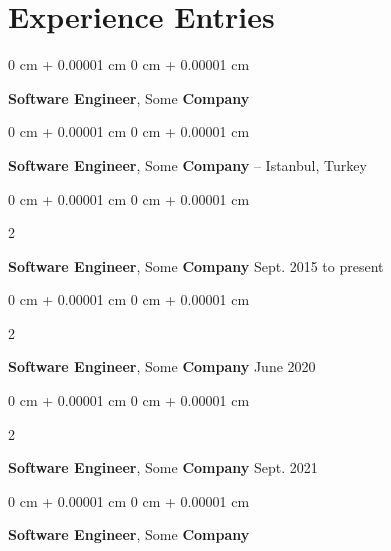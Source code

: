 \documentclass[10pt, letterpaper]{article}
\newenvironment{onecolentry}{
    \begin{adjustwidth}{
        0 cm + 0.00001 cm
    }{
        0 cm + 0.00001 cm
    }
}{
    \end{adjustwidth}
} %
\newenvironment{twocolentry}[2][]{
    \onecolentry
    \def\secondColumn{#2}
    \setcolumnwidth{\fill, 4.1 cm}
    \begin{paracol}{2}
}{
    \switchcolumn \raggedleft \secondColumn
    \end{paracol}
    \endonecolentry
} %
\begin{document}
    
    \section{Experience Entries}

        
        \begin{onecolentry}
            \textbf{Software Engineer}, Some \textbf{Company}\end{onecolentry}

        \vspace{0.10 cm}


        \vspace{0.15 cm}

        \begin{onecolentry}
            \textbf{Software Engineer}, Some \textbf{Company} -- Istanbul, Turkey\end{onecolentry}

        \vspace{0.10 cm}


        \vspace{0.15 cm}

        \begin{twocolentry}{
            Sept. 2015 to present
        }
            \textbf{Software Engineer}, Some \textbf{Company}\end{twocolentry}

        \vspace{0.10 cm}


        \vspace{0.15 cm}

        \begin{twocolentry}{
            June 2020
        }
            \textbf{Software Engineer}, Some \textbf{Company}\end{twocolentry}

        \vspace{0.10 cm}


        \vspace{0.15 cm}

        \begin{twocolentry}{
            Sept. 2021
        }
            \textbf{Software Engineer}, Some \textbf{Company}\end{twocolentry}

        \vspace{0.10 cm}


        \vspace{0.15 cm}

        \begin{onecolentry}
            \textbf{Software Engineer}, Some \textbf{Company}\end{onecolentry}
\end{document}
